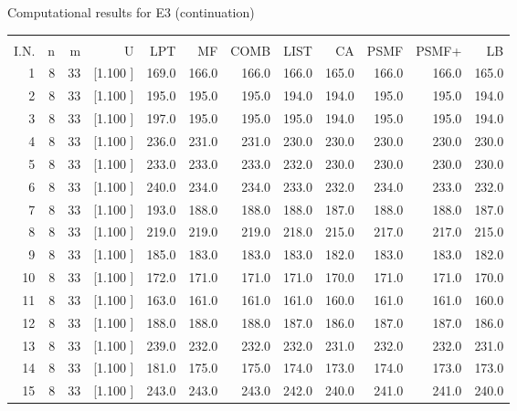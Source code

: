 \documentclass[12pt,a4paper]{article}
\begin{document}
\newpage
\begin{center}
 Computational results for E3 (continuation) {\tiny
\begin{tabular}{r r r r r r r r r r r r}\hline
    &   &   &          &        &        &        &        &        &        &        &       \\[-0.1in]
  I.N.  &  n  &  m  &  U  &  LPT  &  MF  &  COMB  &  LIST  &  CA  & PSMF &PSMF+ & LB \\[0.03in]
\hline
   1&  8& 33&[1.100     ]&   169.0&   166.0&   166.0&   166.0&   165.0&   166.0&   166.0&   165.0\\[-0.02in]
   2&  8& 33&[1.100     ]&   195.0&   195.0&   195.0&   194.0&   194.0&   195.0&   195.0&   194.0\\[-0.02in]
   3&  8& 33&[1.100     ]&   197.0&   195.0&   195.0&   195.0&   194.0&   195.0&   195.0&   194.0\\[-0.02in]
   4&  8& 33&[1.100     ]&   236.0&   231.0&   231.0&   230.0&   230.0&   230.0&   230.0&   230.0\\[-0.02in]
   5&  8& 33&[1.100     ]&   233.0&   233.0&   233.0&   232.0&   230.0&   230.0&   230.0&   230.0\\[-0.02in]
   6&  8& 33&[1.100     ]&   240.0&   234.0&   234.0&   233.0&   232.0&   234.0&   233.0&   232.0\\[-0.02in]
   7&  8& 33&[1.100     ]&   193.0&   188.0&   188.0&   188.0&   187.0&   188.0&   188.0&   187.0\\[-0.02in]
   8&  8& 33&[1.100     ]&   219.0&   219.0&   219.0&   218.0&   215.0&   217.0&   217.0&   215.0\\[-0.02in]
   9&  8& 33&[1.100     ]&   185.0&   183.0&   183.0&   183.0&   182.0&   183.0&   183.0&   182.0\\[-0.02in]
  10&  8& 33&[1.100     ]&   172.0&   171.0&   171.0&   171.0&   170.0&   171.0&   171.0&   170.0\\[-0.02in]
  11&  8& 33&[1.100     ]&   163.0&   161.0&   161.0&   161.0&   160.0&   161.0&   161.0&   160.0\\[-0.02in]
  12&  8& 33&[1.100     ]&   188.0&   188.0&   188.0&   187.0&   186.0&   187.0&   187.0&   186.0\\[-0.02in]
  13&  8& 33&[1.100     ]&   239.0&   232.0&   232.0&   232.0&   231.0&   232.0&   232.0&   231.0\\[-0.02in]
  14&  8& 33&[1.100     ]&   181.0&   175.0&   175.0&   174.0&   173.0&   174.0&   173.0&   173.0\\[-0.02in]
  15&  8& 33&[1.100     ]&   243.0&   243.0&   243.0&   242.0&   240.0&   241.0&   241.0&   240.0\\[-0.02in]

\end{tabular}}
\end{center}
\end{document}
